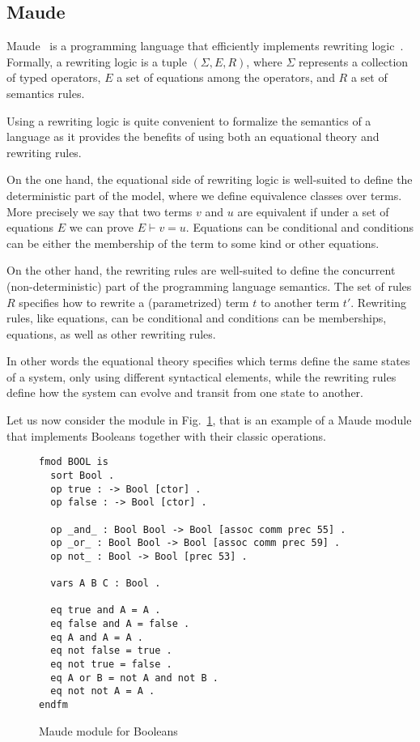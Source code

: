 \documentclass{article}[12pt,a4paper]
\theoremstyle{definition}
\begin{document}

\subsection{Maude}\label{sec:maude}

Maude~\cite{maude} is a programming language that efficiently implements rewriting logic~\cite{MeseguerMS96}.
Formally, a rewriting logic is a tuple $(\Sigma, E, R)$, where $\Sigma$
represents a collection of typed operators, $E$ a set of equations among the operators, and $R$ a set of
semantics rules.

Using a rewriting logic is quite convenient to formalize the
semantics of a language as it provides the benefits of using both an equational theory and rewriting rules.

On the one hand, the equational side of rewriting logic is well-suited to define the deterministic part of the model, where
we define equivalence classes over terms. More precisely we say that two terms
$v$ and $u$ are equivalent if under a set of equations $E$ we can prove $E \vdash
v = u$. Equations can be conditional and conditions can be either the
membership of the term to some kind or other equations.

On the other hand, the rewriting rules are well-suited to define the
concurrent (non-deterministic) part of the programming language
semantics. The set of rules $R$ specifies how to rewrite a
(parametrized) term $t$ to another term $t'$.  Rewriting rules, like
equations, can be conditional and conditions can be
memberships, equations, as well as other rewriting rules.

In other words the equational theory specifies which terms define the same states
of a system, only using different syntactical elements, while the rewriting rules
define how the system can evolve and transit from one state to another.

Let us now consider the module in Fig.~\ref{fig:bool}, that is an example of a Maude module that implements Booleans together with their classic operations.

\begin{figure}[t]
\begin{verbatim}
fmod BOOL is
  sort Bool .
  op true : -> Bool [ctor] .
  op false : -> Bool [ctor] .

  op _and_ : Bool Bool -> Bool [assoc comm prec 55] .
  op _or_ : Bool Bool -> Bool [assoc comm prec 59] .
  op not_ : Bool -> Bool [prec 53] .

  vars A B C : Bool .

  eq true and A = A .
  eq false and A = false .
  eq A and A = A .
  eq not false = true .
  eq not true = false .
  eq A or B = not A and not B .
  eq not not A = A .
endfm
\end{verbatim}
\caption{Maude module for Booleans}\label{fig:bool}
\end{figure}
\end{document}
